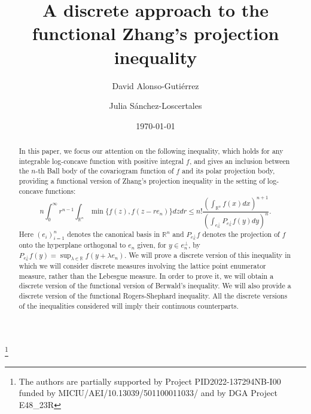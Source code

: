 \documentclass{amsart}
\newcommand{\R}{\mathbb R}
\theoremstyle{remark}
\theoremstyle{definition}
\numberwithin{equation}{section}
\begin{document}

\title{A discrete approach to the functional Zhang's projection inequality}

\author[D.\,Alonso]{David Alonso-Guti\'errez}
\address{\'Area de an\'alisis matem\'atico, Departamento de matem\'aticas, Facultad de Ciencias, Universidad de Zaragoza, Pedro Cerbuna 12, 50009 Zaragoza (Spain), IUMA}

\author[J. S\'anchez]{Julia S\'anchez-Loscertales}
\address{\'Area de an\'alisis matem\'atico, Departamento de matem\'aticas, Facultad de Ciencias, Universidad de Zaragoza, Pedro Cerbuna 12, 50009 Zaragoza (Spain), IUMA}




\thanks{The authors are partially supported by Project PID2022-137294NB-I00  funded by   MICIU/AEI/10.13039/501100011033/ and by DGA Project E48\_23R}

\begin{abstract}
In this paper, we focus our attention on the following inequality, which holds for any integrable log-concave function with positive integral $f$, and gives an inclusion between the $n$-th Ball body of the covariogram function of $f$ and its polar projection body, providing a functional version of Zhang's projection inequality in the setting of log-concave functions:
$$
n\int_0^\infty r^{n-1}\int_{\R^n}\min\{f(z),f(z-re_n)\}dzdr\leq n!\frac{\left(\int_{\R^n}f(x)dx\right)^{n+1}}{\left(\int_{e_n^\perp}P_{e_n^\perp}f(y)dy\right)^n}.
$$
Here $(e_i)_{i=1}^n$ denotes the canonical basis in $\R^n$  and $P_{e_n^\perp} f$ denotes the projection of $f$ onto the hyperplane orthogonal to $e_n$ given, for $y\in e_n^\perp$, by $P_{e_n^\perp} f(y)=\sup_{\lambda\in\R}f(y+\lambda e_n)$. We will prove a discrete version of this inequality in which we will consider discrete measures involving the lattice point enumerator measure, rather than the Lebesgue measure. In order to prove it, we will obtain a discrete version of the functional version of Berwald's inequality. We will also provide a discrete version of the functional Rogers-Shephard inequality. All the discrete versions of the inequalities considered will imply their continuous counterparts.
\end{abstract}

\date{\today}
\maketitle
\end{document}
